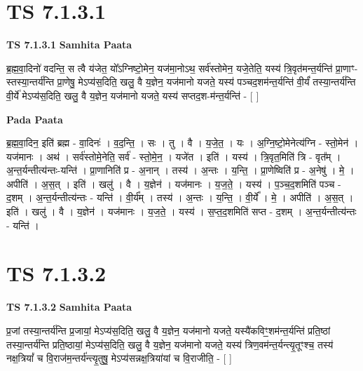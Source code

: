 \documentclass[17pt]{extarticle}
\begin{document}

\section{ TS 7.1.3.1 }

\textbf{TS 7.1.3.1 } \newline
\textbf{Samhita Paata} \newline

ब्र॒ह्म॒वा॒दिनो॑ वदन्ति॒ स त्वै य॑जेत॒ यो᳚ऽग्निष्टो॒मेन॒ यज॑मा॒नोऽथ॒ सर्व॑स्तोमेन॒ यजे॒तेति॒ यस्य॑ त्रि॒वृत॑मन्त॒र्यन्ति॑ प्रा॒णाꣳ-स्तस्या॒न्तर्य॑न्ति प्रा॒णेषु॒ मेऽप्य॑स॒दिति॒ खलु॒ वै य॒ज्ञेन॒ यज॑मानो यजते॒ यस्य॑ पञ्चद॒शम॑न्त॒र्यन्ति॑ वी॒र्यं॑ तस्या॒न्तर्य॑न्ति वी॒र्ये॑ मेऽप्य॑स॒दिति॒ खलु॒ वै य॒ज्ञेन॒ यज॑मानो यजते॒ यस्य॑ सप्तद॒श-म॑न्त॒र्यन्ति॑ - [  ] \newline

\textbf{Pada Paata} \newline

ब्र॒ह्म॒वा॒दिन॒ इति॑ ब्रह्म - वा॒दिनः॑ । व॒द॒न्ति॒ । सः । तु । वै । य॒जे॒त॒ । यः । अ॒ग्नि॒ष्टो॒मेनेत्य॑ग्नि - स्तो॒मेन॑ । यज॑मानः । अथ॑ । सर्व॑स्तोमे॒नेति॒ सर्व॑ - स्तो॒मे॒न॒ । यजे॑त । इति॑ । यस्य॑ । त्रि॒वृत॒मिति॑ त्रि - वृत᳚म् । अ॒न्त॒र्यन्तीत्य॑न्तः-यन्ति॑ । प्रा॒णानिति॑ प्र - अ॒नान् । तस्य॑ । अ॒न्तः । य॒न्ति॒ । प्रा॒णेष्विति॑ प्र - अ॒नेषु॑ । मे॒ । अपीति॑ । अ॒स॒त् । इति॑ । खलु॑ । वै । य॒ज्ञेन॑ । यज॑मानः । य॒ज॒ते॒ । यस्य॑ । प॒ञ्च॒द॒शमिति॑ पञ्च - द॒शम् । अ॒न्त॒र्यन्तीत्य॑न्तः - यन्ति॑ । वी॒र्य᳚म् । तस्य॑ । अ॒न्तः । य॒न्ति॒ । वी॒र्ये᳚ । मे॒ । अपीति॑ । अ॒स॒त् । इति॑ । खलु॑ । वै । य॒ज्ञेन॑ । यज॑मानः । य॒ज॒ते॒ । यस्य॑ । स॒प्त॒द॒शमिति॑ सप्त - द॒शम् । अ॒न्त॒र्यन्तीत्य॑न्तः - यन्ति॑ ।  \newline





\section{ TS 7.1.3.2 }

\textbf{TS 7.1.3.2 } \newline
\textbf{Samhita Paata} \newline

प्र॒जां तस्या॒न्तर्य॑न्ति प्र॒जायां॒ मेऽप्य॑स॒दिति॒ खलु॒ वै य॒ज्ञेन॒ यज॑मानो यजते॒ यस्यै॑कविꣳ॒॒शम॑न्त॒र्यन्ति॑ प्रति॒ष्ठां तस्या॒न्तर्य॑न्ति प्रति॒ष्ठायां॒ मेऽप्य॑स॒दिति॒ खलु॒ वै य॒ज्ञेन॒ यज॑मानो यजते॒ यस्य॑ त्रिण॒वम॑न्त॒र्यन्त्यृ॒तूꣳश्च॒ तस्य॑ नक्ष॒त्रियां᳚ च वि॒राज॑म॒न्तर्य॑न्त्यृ॒तुषु॒ मेऽप्य॑सन्नक्ष॒त्रिया॑यां च वि॒राजीति॒ - [  ] \newline
\end{document}
